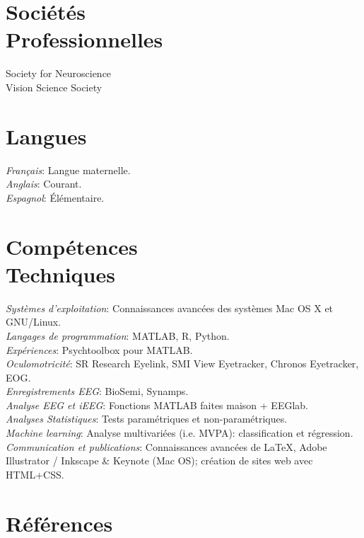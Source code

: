 \documentclass[margin,line]{resume}
\begin{document}
\begin{resume}
\vspace{3mm}
\section{\mysidestyle Sociétés\\Professionnelles}
	Society for Neuroscience\\
	Vision Science Society

	
\vspace{3mm}
\section{\mysidestyle Langues}
	\textsl{Français}: Langue maternelle.\\
	\textsl{Anglais}: Courant.\\
	\textsl{Espagnol}: \'Elémentaire.


\vspace{3mm}
\section{\mysidestyle Compétences\\Techniques}
	\textsl{Systèmes d'exploitation}: Connaissances avancées des systèmes Mac OS X et GNU/Linux.\\
	\textsl{Langages de programmation}: MATLAB, R, Python.\\
	\textsl{Expériences}: Psychtoolbox pour MATLAB.\\
	\textsl{Oculomotricité}: SR Research Eyelink, SMI View Eyetracker, Chronos Eyetracker, EOG.\\
	\textsl{Enregistrements EEG}: BioSemi, Synamps.\\
	\textsl{Analyse EEG et iEEG}: Fonctions MATLAB faites maison + EEGlab.\\
	\textsl{Analyses Statistiques}: Tests paramétriques et non-paramétriques.\\
	\textsl{Machine learning}: Analyse multivariées (i.e. MVPA): classification et régression.\\
	\textsl{Communication et publications}: Connaissances avancées de \LaTeX, Adobe Illustrator / Inkscape \& Keynote (Mac OS); création de sites web avec HTML+CSS.


\vspace{3mm}
\section{\mysidestyle Références} 


\end{resume}
\end{document}
